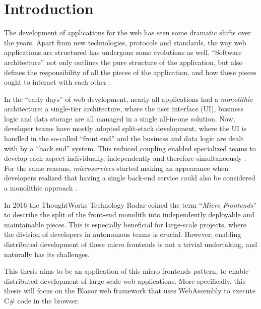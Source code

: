 
\section{Introduction}
\label{sec:introduction}


The development of applications for the web has seen some dramatic shifts over
the years. Apart from new technologies, protocols and standards, the way web
applications are structured has undergone some evolutions as well. ``Software
architecture'' not only outlines the pure structure of the application, but also
defines the responsibility of all the pieces of the application, and how these
pieces ought to interact with each other \autocite{Fedorov_etal_1998}.

In the ``early days'' of web development, nearly all applications had a
\textit{monolithic} architecture: a single-tier architecture, where the user
interface (UI), business logic and data storage are all managed in a single
all-in-one solution. Now, developer teams have mostly adopted split-stack
development, where the UI is handled in the so-called ``front end'' and the
business and data logic are dealt with by a ``back end'' system. This reduced
coupling enabled specialized teams to develop each aspect individually,
independently and therefore simultaneously \autocite{Dunkley_2016}. For the same
reasons, \textit{microservices} started making an appearance when developers
realized that having a single back-end service could also be considered a
monolithic approach \autocite{Fowler_Microservices_2014}.

In 2016 the ThoughtWorks Technology Radar \autocite{ThoughtWorks_2020} coined
the term ``\textit{Micro Frontends}'' to describe the split of the front-end
monolith into independently deployable and maintainable pieces. This is
especially beneficial for large-scale projects, where the division of developers
in autonomous teams is crucial. However, enabling distributed development of
these micro frontends is not a trivial undertaking, and naturally has its
challenges.

This thesis aims to be an application of this micro frontends pattern, to enable
distributed development of large scale web applications. More specifically, this
thesis will focus on the Blazor web framework
that uses WebAssembly to execute C\# code
in the browser.


